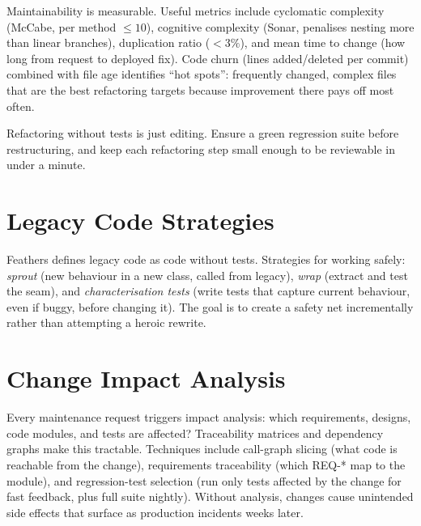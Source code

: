 Maintainability is measurable. Useful metrics include cyclomatic complexity (McCabe, per method $\leq 10$), cognitive complexity (Sonar, penalises nesting more than linear branches), duplication ratio ($<3\%$), and mean time to change (how long from request to deployed fix). Code churn (lines added/deleted per commit) combined with file age identifies ``hot spots'': frequently changed, complex files that are the best refactoring targets because improvement there pays off most often.

\begin{remark}
Refactoring without tests is just editing. Ensure a green regression suite before restructuring, and keep each refactoring step small enough to be reviewable in under a minute.
\end{remark}

\section{Legacy Code Strategies}

Feathers defines legacy code as code without tests. Strategies for working safely: \emph{sprout} (new behaviour in a new class, called from legacy), \emph{wrap} (extract and test the seam), and \emph{characterisation tests} (write tests that capture current behaviour, even if buggy, before changing it). The goal is to create a safety net incrementally rather than attempting a heroic rewrite.

\section{Change Impact Analysis}

Every maintenance request triggers impact analysis: which requirements, designs, code modules, and tests are affected? Traceability matrices and dependency graphs make this tractable. Techniques include call-graph slicing (what code is reachable from the change), requirements traceability (which REQ-* map to the module), and regression-test selection (run only tests affected by the change for fast feedback, plus full suite nightly). Without analysis, changes cause unintended side effects that surface as production incidents weeks later.

